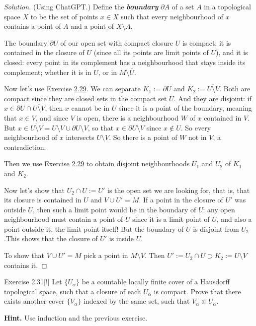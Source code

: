 \begin{proof}[Solution]\leavevmode
	(Using ChatGPT.) Define the \textit{\textbf{boundary}} \(\partial A\) of a set  \(A\) in a topological space \(X\) to be the set of points \(x \in X\) such that every neighbourhood of \(x\) contains a point of \(A\) and a point of \(X\setminus A\).


	The boundary \(\partial U\) of our open set with compact closure \(U\) is compact: it is contained in the closure of \(U\) (since all its points are limit points of \(U\)), and it is closed: every point in its complement has a neighbourhood that stays inside its complement; whether it is in \(U\), or in \(M\setminus \bar{U}\).

	Now let's use Exercise \hyperref[exer:2.29]{2.29}. We can separate \(K_1:=\partial U\) and \(K_2:=\overline{U \setminus V}\). Both are compact since they are closed sets in the compact set \(\overline{U}\). And they are disjoint: if \(x \in \partial U \cap \overline{U\setminus V}\), then \(x\) cannot be in \(U\) since it is a point of the boundary, meaning that \(x \in V\), and since \(V\) is open, there is a  neighbourhood \(W\) of \(x\) contained in \(V\). But \(x \in \overline{U \setminus V}=U\setminus V \cup \partial U\setminus V\), so that \(x \in \partial U \setminus V\) since \(x \not \in U\). So every neighbourhood of \(x\) intersects \(U\setminus V\). So there is a point of \(W\) not in \(V\), a contradiction.

	Then we use  Exercise \hyperref[exer:2.29]{2.29} to obtain disjoint neighbourhoods \(U_1\) and \(U_2\) of \(K_1\) and \(K_2\).

	Now let's show that \(U_2 \cap U:=U'\) is the open set we are looking for, that is, that its closure is contained in \(U\) and \(V \cup U'=M\). If a point in the closure of \(U'\) was outside \(U\), then such a limit point would be in the boundary of \(U\): any open neighbourhood must contain a point of \(U\) since it is a limit point of \(U\), and also a point outside it, the limit point itself! But the boundary of \(U\) is disjoint from  \(U_2\).This shows that the closure of \(U'\) is inside \(U\).

	To show that \(V \cup  U'=M\) pick a point in \(M \setminus V\). Then \(U':=U_2 \cap U\supset K_2:=U\setminus V\) contains it.
\end{proof}

	\begin{thing4}{Exercise 2.31}[!]\label{exer:2.31}\leavevmode
Let \(\{U_\alpha\}\) be a countable locally finite cover of a Hausdorff topological space, such that a closure of each \(U_\alpha\) is compact. Prove that there exists another cover \(\{V_\alpha\}\) indexed by the same set, such that \(V_\alpha \Subset U_\alpha\).

\textbf{Hint.} Use induction and the previous exercise.
\end{thing4}

